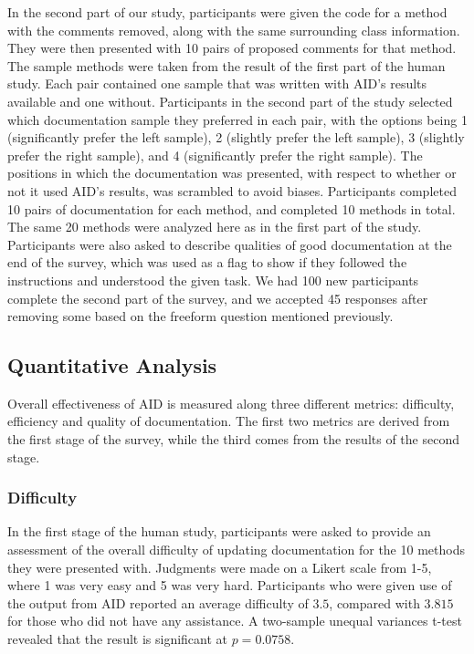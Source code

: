 \documentclass[preprint]{sigplanconf}
\begin{document}
In the second part of our study, participants were given the code for a method with the comments removed, along with the same surrounding class information. They were then presented with 10 pairs of proposed comments for that method. The sample methods were taken from the result of the first part of the human study. Each pair contained one sample that was written with AID's results available and one without. Participants in the second part of the study selected which documentation sample they preferred in each pair, with the options being 1 (significantly prefer the left sample), 2 (slightly prefer the left sample), 3 (slightly prefer the right sample), and 4 (significantly prefer the right sample). The positions in which the documentation was presented, with respect to whether or not it used AID's results, was scrambled to avoid biases. Participants completed 10 pairs of documentation for each method, and completed 10 methods in total. The same 20 methods were analyzed here as in the first part of the study. Participants were also asked to describe qualities of good documentation at the end of the survey, which was used as a flag to show if they followed the instructions and understood the given task. We had 100 new participants complete the second part of the survey, and we accepted 45 responses after removing some based on the freeform question mentioned previously.

\subsection{Quantitative Analysis}
Overall effectiveness of AID is measured along three different metrics: difficulty, efficiency and quality of documentation. The first two metrics are derived from the first stage of the survey, while the third comes from the results of the second stage.

\subsubsection{Difficulty}
In the first stage of the human study, participants were asked to provide an assessment of the overall difficulty of updating documentation for the 10 methods they were presented with. Judgments were made on a Likert scale from 1-5, where 1 was very easy and 5 was very hard. Participants who were given use of the output from AID reported an average difficulty of \(3.5\), compared with \(3.815\) for those who did not have any assistance. A two-sample unequal variances t-test revealed that the result is significant at \(p = 0.0758\).
\end{document}
